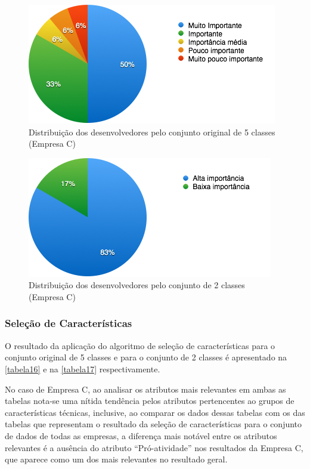 \begin{figure}[h]
	\centering
	\includegraphics[scale=0.8]{figs/empresa_c/imagem-classe-original.png}
	\caption{\label{fig_15}Distribuição dos desenvolvedores pelo conjunto original de 5 classes (Empresa C)}
\end{figure}

\begin{figure}[h]
	\centering
	\includegraphics[scale=0.8]{figs/empresa_c/imagem-classe-alternativa.png}
	\caption{\label{fig_16}Distribuição dos desenvolvedores pelo conjunto de 2 classes (Empresa C)}
\end{figure}

\subsubsection{Seleção de Características}
O resultado da aplicação do algoritmo de seleção de características para o conjunto original de 5 classes e para o conjunto de 2 classes é apresentado na \autoref{tabela16} e na \autoref{tabela17} respectivamente.

No caso de Empresa C, ao analisar os atributos mais relevantes em ambas as tabelas nota-se uma nítida tendência pelos atributos pertencentes ao grupos de características técnicas, inclusive, ao comparar os dados dessas tabelas com os das tabelas que representam o resultado da seleção de características para o conjunto de dados de todas as empresas, a diferença mais notável entre os atributos relevantes é a ausência do atributo ``Pró-atividade'' nos resultados da Empresa C, que aparece como um dos mais relevantes no resultado geral.

